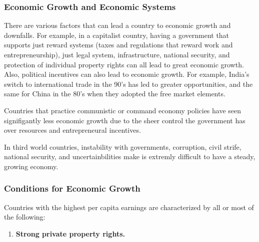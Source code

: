 \documentclass[a4paper, 12pt] {article}
\begin{document}
\subsubsection{Economic Growth and Economic Systems}
There are various factors that can lead a country to economic growth and downfalls.
For example, in a capitalist country, having a government that supports just 
reward systems (taxes and regulations that reward work and entrepreneurship), 
just legal system, infrastructure, national security, and protection of individual
property rights can all lead to great economic growth. Also, political incentives
can also lead to economic growth. For example, India's switch to international 
trade in the 90's has led to greater opportunities, and the same for China in
the 80's when they adopted the free market elements.

Countries that practice communistic or command economy policies have seen 
signifigantly less economic growth due to the sheer control the government has
over resources and entrepreneural incentives.

In third world countries, instability with governments, corruption, civil strife,
national security, and uncertainbilities make is extremly difficult to have a 
steady, growing economy.

\subsubsection{Conditions for Economic Growth}
Countries with the highest per capita earnings are characterized by all or most
of the following:

\begin{enumerate}
    \item \textbf{Strong private property rights.}

\end{enumerate}
\end{document}
